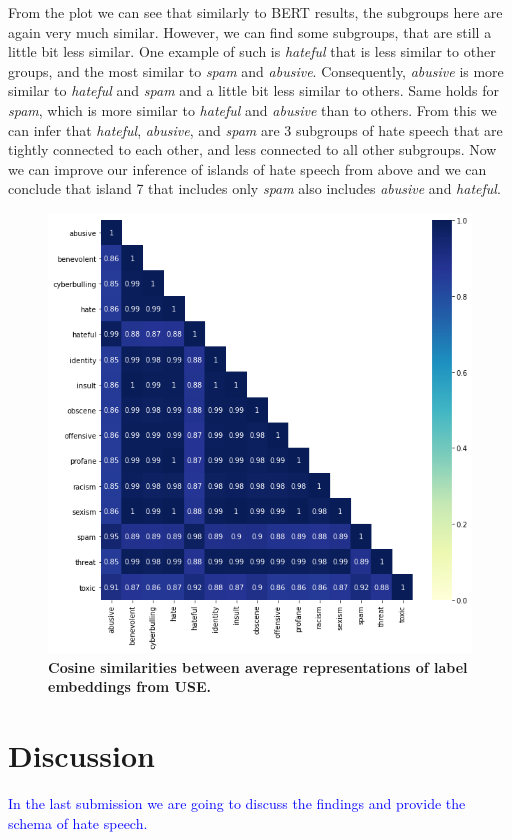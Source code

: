 \documentclass[fleqn,moreauthors,10pt]{ds_report}
\begin{document}
From the plot we can see that similarly to BERT results, the subgroups here are again very much similar. However, we can find some subgroups, that are still a little bit less similar. One example of such is \textit{hateful} that is less similar to other groups, and the most similar to \textit{spam} and \textit{abusive}. Consequently, \textit{abusive} is more similar to \textit{hateful} and \textit{spam} and a little bit less similar to others. Same holds for \textit{spam}, which is more similar to  \textit{hateful} and \textit{abusive} than to others. From this we can infer that  \textit{hateful}, \textit{abusive}, and  \textit{spam} are 3 subgroups of hate speech that are tightly connected to each other, and less connected to all other subgroups. Now we can improve our inference of islands of hate speech from above and we can conclude that island 7 that includes only \textit{spam} also includes \textit{abusive} and \textit{hateful}.

\begin{figure}[htb]\centering
	\includegraphics[width=\linewidth]{use_sim.png}
	\caption{\textbf{Cosine similarities between average representations of label embeddings from USE.} }
	\label{fig:use_sim}
\end{figure}


\section*{Discussion}

\textcolor{blue}{In the last submission we are going to discuss the findings and provide the schema of hate speech.}



\end{document}
